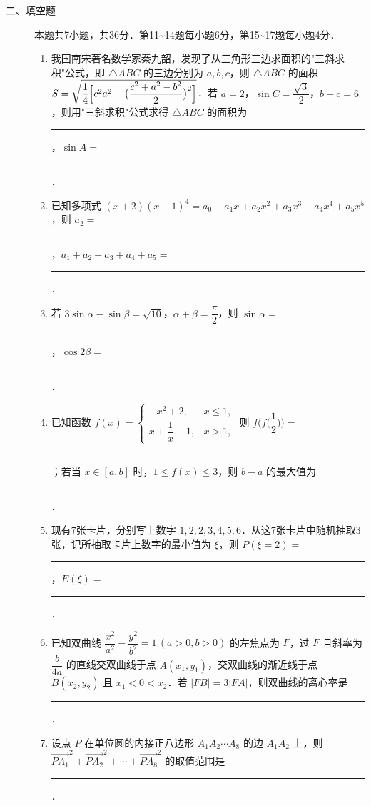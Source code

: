 \begin{description}
    \item[二、填空题] 本题共7小题，共36分．第11\textasciitilde14题每小题6分，第15\textasciitilde17题每小题4分．
    \begin{enumerate}[leftmargin=5pt]
      \addtocounter{enumi}{+10}
        \item 我国南宋著名数学家秦九韶，发现了从三角形三边求面积的"三斜求积"公式，即 $\triangle ABC$ 的三边分别为 $a,b,c$，则 $\triangle ABC$ 的面积 $S=\sqrt{\dfrac{1}{4}\Bigl[c^2a^2-\bigl(\dfrac{c^2+a^2-b^2}{2}\bigr)^2\Bigr]}$．若 $a=2$，$\sin C=\dfrac{\sqrt{3}}{2}$，$b+c=6$，则用"三斜求积"公式求得 $\triangle ABC$ 的面积为 \rule[-0.3ex]{3em}{0.4pt}，$\sin A=$ \rule[-0.3ex]{3em}{0.4pt}．
        \item 已知多项式 $(x+2)(x-1)^4=a_0+a_1x+a_2x^2+a_3x^3+a_4x^4+a_5x^5$，则 $a_2=$ \rule[-0.3ex]{3em}{0.4pt}，$a_1+a_2+a_3+a_4+a_5=$ \rule[-0.3ex]{3em}{0.4pt}．
        \item 若 $3\sin\alpha-\sin\beta=\sqrt{10}$，$\alpha+\beta=\dfrac{\pi}{2}$，则 $\sin\alpha=$ \rule[-0.3ex]{3em}{0.4pt}，$\cos2\beta=$ \rule[-0.3ex]{3em}{0.4pt}．
        \item 已知函数 $f(x)=\begin{cases}-x^2+2,&x\leqslant1,\\x+\dfrac{1}{x}-1,&x>1,\end{cases}$ 则 $f\bigl(f\bigl(\dfrac{1}{2}\bigr)\bigr)=$ \rule[-0.3ex]{3em}{0.4pt}；若当 $x\in[a,b]$ 时，$1\leqslant f(x)\leqslant3$，则 $b-a$ 的最大值为 \rule[-0.3ex]{3em}{0.4pt}．
        \item 现有7张卡片，分别写上数字 $1,2,2,3,4,5,6$．从这7张卡片中随机抽取3张，记所抽取卡片上数字的最小值为 $\xi$，则 $P(\xi=2)=$ \rule[-0.3ex]{3em}{0.4pt}，$E(\xi)=$ \rule[-0.3ex]{3em}{0.4pt}．
        \item 已知双曲线 $\dfrac{x^2}{a^2}-\dfrac{y^2}{b^2}=1\,(a>0,b>0)$ 的左焦点为 $F$，过 $F$ 且斜率为 $\dfrac{b}{4a}$ 的直线交双曲线于点 $A(x_1,y_1)$，交双曲线的渐近线于点 $B(x_2,y_2)$ 且 $x_1<0<x_2$．若 $|FB|=3|FA|$，则双曲线的离心率是 \rule[-0.3ex]{3em}{0.4pt}．
        \item 设点 $P$ 在单位圆的内接正八边形 $A_1A_2\cdots A_8$ 的边 $A_1A_2$ 上，则 $\overrightarrow{PA_1}^2+\overrightarrow{PA_2}^2+\cdots+\overrightarrow{PA_8}^2$ 的取值范围是 \rule[-0.3ex]{3em}{0.4pt}．
    \end{enumerate}
\end{description}

